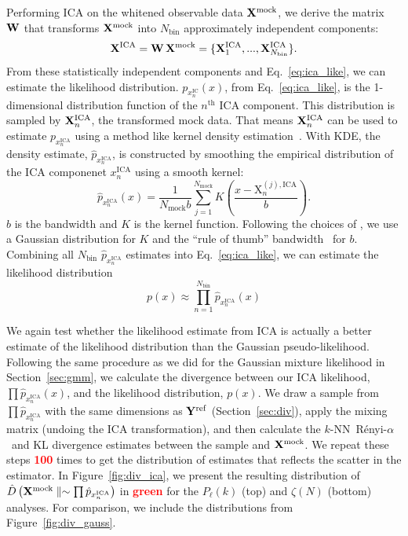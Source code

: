\documentclass[12pt, letterpaper, preprint]{aastex}
\newcommand{\beq}{\begin{equation}}
\newcommand{\eeq}{\end{equation}}
\newcommand{\todo}[1]{{\bf \textcolor{red}{#1}}}
\newcommand{\Xmock}{{\bf X}^\mathrm{mock}}
\newcommand{\Yref}{{\bf Y}^\mathrm{ref}}
\newcommand{\Ralpha}{R\'enyi-$\alpha$}
\begin{document}
Performing ICA on the whitened observable data $\Xmock$, we derive the 
matrix ${\bf W}$ that transforms $\Xmock$ into $N_\mathrm{bin}$
approximately independent components: 
\beq
{\bf X}^\mathrm{ICA} = {\bf W}\,\Xmock = \{{\bf X}^\mathrm{ICA}_1, ..., {\bf X}^\mathrm{ICA}_{N_\mathrm{bin}}\}.
\eeq
From these statistically independent components and Eq.~\ref{eq:ica_like}, 
we can estimate the likelihood distribution. $p_{x^\mathrm{IC}_n} (x)$, 
from Eq.~\ref{eq:ica_like}, is the 1-dimensional distribution 
function of the $n^\mathrm{th}$ ICA component. This distribution 
is sampled by ${\bf X}^\mathrm{ICA}_n$, the transformed mock data. 
That means ${\bf X}^\mathrm{ICA}_n$ can be used to estimate 
$p_{x^\mathrm{ICA}_n}$ using a method like kernel 
density estimation~\citep[KDE; \emph{e.g.}][]{9780387848587,feigelson2012}. 
With KDE, the density estimate, $\hat{p}_{x^\mathrm{ICA}_n}$, is constructed by 
smoothing the empirical distribution of the ICA componenet $x^\mathrm{ICA}_n$ 
using a smooth kernel: 
\beq
\hat{p}_{x^\mathrm{ICA}_n}(x) = \frac{1}{N_\mathrm{mock}b} \sum\limits_{j=1}^{N_\mathrm{mock}} K \left( \frac{x - \mathrm{X}^{(j),\mathrm{ICA}}_n}{b} \right). 
\eeq
$b$ is the bandwidth and $K$ is the kernel function. Following the 
choices of \cite{hartlap2009}, we use a Gaussian distribution for $K$ and the 
``rule of thumb'' bandwidth~\cite[also known as Scott's rule;][]{scott1992,davison2008} 
for $b$. Combining all $N_\mathrm{bin}$ $\hat{p}_{x^\mathrm{ICA}_n}$ 
estimates into Eq.~\ref{eq:ica_like}, we can estimate the likelihood 
distribution 
\beq
p(x) \approx \prod\limits_{n=1}^{N_\mathrm{bin}} \hat{p}_{x^\mathrm{ICA}_n}(x)
\eeq

We again test whether the likelihood estimate from ICA is actually 
a better estimate of the likelihood distribution than the Gaussian 
pseudo-likelihood. Following the same procedure as we 
did for the Gaussian mixture likelihood in Section~\ref{sec:gmm}, we 
calculate the divergence between our ICA likelihood, $\prod \hat{p}_{x^\mathrm{ICA}_n}(x)$, 
and the likelihood distribution, $p(x)$. We draw a sample from 
$\prod \hat{p}_{x^\mathrm{ICA}_n}$ with the same dimensions as 
$\Yref$ (Section~\ref{sec:div}), apply the mixing matrix 
(undoing the ICA transformation), and then calculate the 
$k$-NN~\Ralpha~and KL divergence estimates between the sample and $\Xmock$. 
We repeat these steps \todo{100} times to get the distribution of estimates 
that reflects the scatter in the estimator. In Figure~\ref{fig:div_ica}, 
we present the resulting distribution of 
$\hat{D}\left(\Xmock \parallel \sim \prod \hat{p}_{x^\mathrm{ICA}_n} \right)$
in \todo{green} for the $P_\ell(k)$ (top) and $\zeta(N)$ (bottom) analyses. 
For comparison, we include the distributions from Figure~\ref{fig:div_gauss}. 
\end{document}
